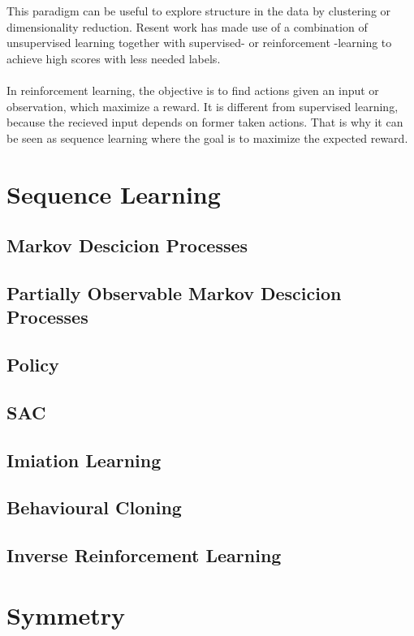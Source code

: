 This paradigm can be useful to explore structure in the data by clustering or dimensionality reduction. Resent work has made use of a combination of unsupervised 
learning together with supervised- or reinforcement -learning to achieve high scores with less needed labels.\\ \\

In reinforcement learning, the objective is to find actions given an input or observation, which maximize a reward. It is different from supervised learning, 
because the recieved input depends on former taken actions. That is why it can be seen as sequence learning where the goal is to maximize the expected reward.

\section{Sequence Learning}
\subsection{Markov Descicion Processes}
\subsection{Partially Observable Markov Descicion Processes}
\subsection{Policy}

\subsection{SAC}
\subsection{Imiation Learning}
\subsection{Behavioural Cloning}
\subsection{Inverse Reinforcement Learning}
\section{Symmetry}

